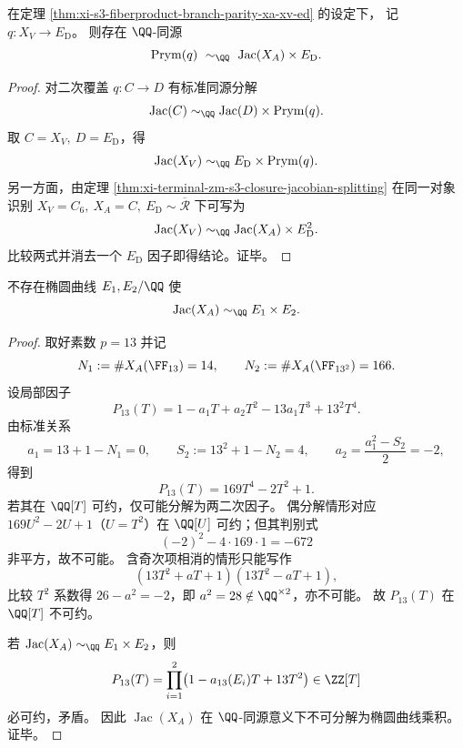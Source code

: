 \begin{theorem}\label{thm:xi-prym-q-decomposition-jacxa-ed}
在定理 \ref{thm:xi-s3-fiberproduct-branch-parity-xa-xv-ed} 的设定下，
记 \(q:X_V\to E_{\mathrm D}\)。
则存在 \(\QQ\)-同源
\[
\operatorname{Prym}(q)\ \sim_{\QQ}\ \operatorname{Jac}(X_A)\times E_{\mathrm D}.
\]
\end{theorem}
\begin{proof}
对二次覆盖 \(q:C\to D\) 有标准同源分解
\[
\operatorname{Jac}(C)\sim_{\QQ}\operatorname{Jac}(D)\times \operatorname{Prym}(q).
\]
取 \(C=X_V,\ D=E_{\mathrm D}\)，得
\[
\operatorname{Jac}(X_V)\sim_{\QQ}E_{\mathrm D}\times \operatorname{Prym}(q).
\]
另一方面，由定理 \ref{thm:xi-terminal-zm-s3-closure-jacobian-splitting}
在同一对象识别 \(X_V=C_6,\ X_A=C,\ E_{\mathrm D}\sim \overline{\mathcal R}\) 下可写为
\[
\operatorname{Jac}(X_V)\sim_{\QQ}\operatorname{Jac}(X_A)\times E_{\mathrm D}^{2}.
\]
比较两式并消去一个 \(E_{\mathrm D}\) 因子即得结论。证毕。
\end{proof}

\begin{theorem}\label{thm:xi-jac-xa-q-indecomposable-via-p13}
不存在椭圆曲线 \(E_1,E_2/\QQ\) 使
\[
\operatorname{Jac}(X_A)\sim_{\QQ}E_1\times E_2.
\]
\end{theorem}
\begin{proof}
取好素数 \(p=13\) 并记
\[
N_1:=\#X_A(\FF_{13})=14,\qquad N_2:=\#X_A(\FF_{13^2})=166.
\]
设局部因子
\[
P_{13}(T)=1-a_1T+a_2T^2-13a_1T^3+13^2T^4.
\]
由标准关系
\[
a_1=13+1-N_1=0,\qquad
S_2:=13^2+1-N_2=4,\qquad
a_2=\frac{a_1^2-S_2}{2}=-2,
\]
得到
\[
P_{13}(T)=169T^4-2T^2+1.
\]
若其在 \(\QQ[T]\) 可约，仅可能分解为两二次因子。
偶分解情形对应 \(169U^2-2U+1\)（\(U=T^2\)）在 \(\QQ[U]\) 可约；但其判别式
\[
(-2)^2-4\cdot169\cdot 1=-672
\]
非平方，故不可能。
含奇次项相消的情形只能写作
\[
(13T^2+aT+1)(13T^2-aT+1),
\]
比较 \(T^2\) 系数得 \(26-a^2=-2\)，即 \(a^2=28\notin\QQ^{\times2}\)，亦不可能。
故 \(P_{13}(T)\) 在 \(\QQ[T]\) 不可约。
\par
若 \(\operatorname{Jac}(X_A)\sim_{\QQ}E_1\times E_2\)，则
\[
P_{13}(T)=\prod_{i=1}^{2}\bigl(1-a_{13}(E_i)T+13T^2\bigr)
\in \ZZ[T]
\]
必可约，矛盾。
因此 \(\operatorname{Jac}(X_A)\) 在 \(\QQ\)-同源意义下不可分解为椭圆曲线乘积。证毕。
\end{proof}

\endinput

